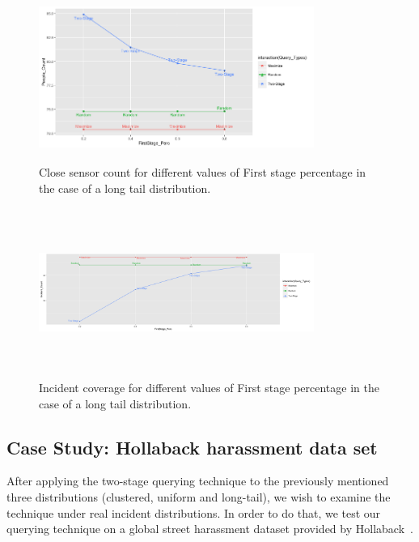 \documentclass{acm_proc_article-sp}
\begin{document}
\begin{figure}[!h]
\centering
  \includegraphics[width=9cm ,height=5.5cm]{figuresPng/LT-closePeople.png}
  \caption{Close sensor count for different values of First stage percentage in the case of a long tail distribution. }
  \label{fig:LTClosePeople}
\end{figure}

\begin{figure}[!h]
\centering
  \includegraphics[width=9cm ,height=5.5cm]{figuresPng/LT-incidCov.png}
  \caption{Incident coverage for different values of First stage percentage in the case of a long tail distribution. }
  \label{fig:LTIncdCove}
\end{figure}



\subsection{Case Study: Hollaback harassment data set}
After applying the two-stage querying technique to the previously mentioned three distributions (clustered, uniform and long-tail), we wish to examine the technique under real incident distributions. In order to do that, we test our querying technique on a global street harassment dataset provided by Hollaback~\cite{hollaback}.
\end{document}
